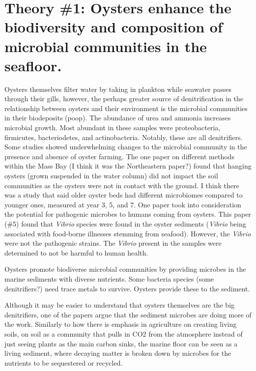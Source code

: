 \documentclass[
  11pt,
]{article}
\begin{document}
\section{Theory \#1: Oysters enhance the biodiversity and composition of
microbial communities in the
seafloor.}\label{theory-1-oysters-enhance-the-biodiversity-and-composition-of-microbial-communities-in-the-seafloor.}

Oysters themselves filter water by taking in plankton while seawater
passes through their gills, however, the perhaps greater source of
denitrification in the relationship between oysters and their
environment is the microbial communities in their biodeposits (poop).
The abundance of urea and ammonia increases microbial growth. Most
abundant in these samples were proteobacteria, firmicutes,
bacteriodetes, and actinobacteria. Notably, these are all denitrifiers.
Some studies showed underwhelming changes to the microbial community in
the presence and absence of oyster farming. The one paper on different
methods within the Mass Bay (I think it was the Northeastern paper?)
found that hanging oysters (grown suspended in the water column) did not
impact the soil communities as the oysters were not in contact with the
ground. I think there was a study that said older oyster beds had
different microbiomes compared to younger ones, measured at year 3, 5,
and 7. One paper took into consideration the potential for pathogenic
microbes to humans coming from oysters. This paper (\#5) found that
\emph{Vibrio} species were found in the oyster sediments (\emph{Vibrio}
being associated with food-borne illnesses stemming from seafood).
However, the \emph{Vibrio} were not the pathogenic strains. The
\emph{Vibrio} present in the samples were determined to not be harmful
to human health.

Oysters promote biodiverse microbial communities by providing microbes
in the marine sediments with diverse nutrients. Some bacteria species
(some denitrifiers?) need trace metals to survive. Oysters provide these
to the sediment.

Although it may be easier to understand that oysters themselves are the
big denitrifiers, one of the papers argue that the sediment microbes are
doing more of the work. Similarly to how there is emphasis in
agriculture on creating living soils, on soil as a community that pulls
in CO2 from the atmosphere instead of just seeing plants as the main
carbon sinks, the marine floor can be seen as a living sediment, where
decaying matter is broken down by microbes for the nutrients to be
sequestered or recycled.
\end{document}
